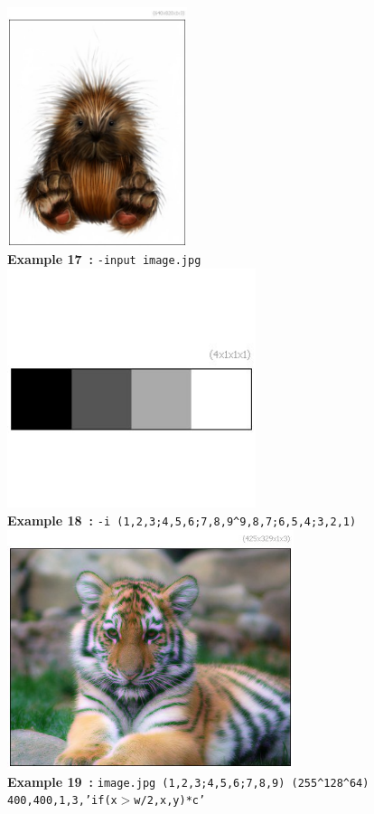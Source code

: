 \documentclass[a4paper,11pt,twoside]{book}
\begin{document}
\begin{center}\includegraphics[keepaspectratio=true,height=7cm,width=\textwidth]{img/gmic_def17.jpg}\\
{\footnotesize \textbf{Example 17~:} \texttt{-input image.jpg}}
\\\includegraphics[keepaspectratio=true,height=7cm,width=\textwidth]{img/gmic_def18.jpg}\\
{\footnotesize \textbf{Example 18~:} \texttt{-i (1,2,3;4,5,6;7,8,9\textasciicircum 9,8,7;6,5,4;3,2,1)}}
\\\includegraphics[keepaspectratio=true,height=7cm,width=\textwidth]{img/gmic_def19.jpg}\\
{\footnotesize \textbf{Example 19~:} \texttt{image.jpg (1,2,3;4,5,6;7,8,9) (255\textasciicircum 128\textasciicircum 64) 400,400,1,3,'if(x$>$w/2,x,y)*c'}}
\end{center}
\end{document}
